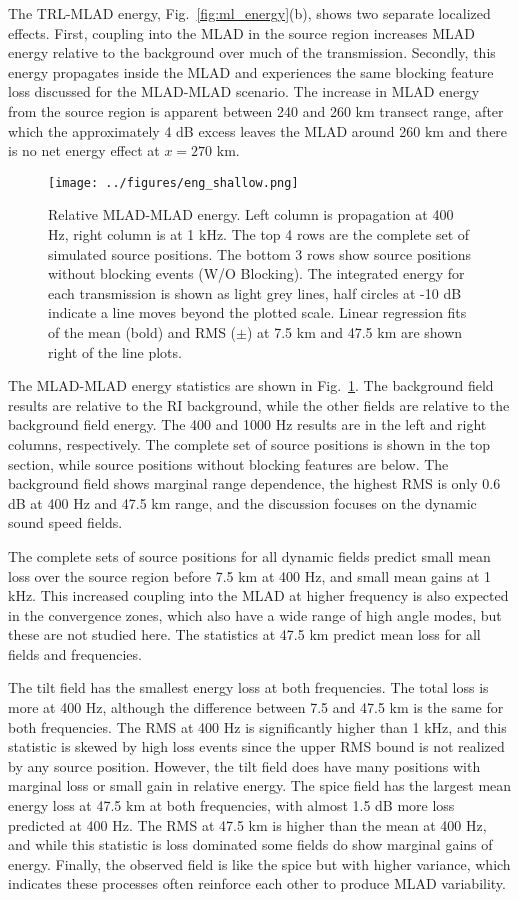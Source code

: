 \documentclass[preprint,NumberedRefs]{JASA}
\begin{document}
The TRL-MLAD energy, Fig.~\ref{fig:ml_energy}(b), shows two separate localized effects. First, coupling into the MLAD in the source region increases MLAD energy relative to the background over much of the transmission. Secondly, this energy propagates inside the MLAD and experiences the same blocking feature loss discussed for the MLAD-MLAD scenario. The increase in MLAD energy from the source region is apparent between 240 and 260 km transect range, after which the approximately 4 dB excess leaves the MLAD around 260 km and there is no net energy effect at $x=270$ km.

\begin{figure}
\texttt{[image: ../figures/eng\_shallow.png]}
    \caption{Relative MLAD-MLAD energy. Left column is propagation at 400 Hz, right column is at 1 kHz. The top 4 rows are the complete set of simulated source positions. The bottom 3 rows show source positions without blocking events (W/O Blocking). The integrated energy for each transmission is shown as light grey lines, half circles at -10 dB indicate a line moves beyond the plotted scale. Linear regression fits of the mean (bold) and RMS ($\pm$) at 7.5 km and 47.5 km are shown right of the line plots.}
    \label{fig:shal_eng}
\end{figure}
The MLAD-MLAD energy statistics are shown in Fig.~\ref{fig:shal_eng}. The background field results are relative to the RI background, while the other fields are relative to the background field energy. The 400 and 1000 Hz results are in the left and right columns, respectively. The complete set of source positions is shown in the top section, while source positions without blocking features are below. The background field shows marginal range dependence, the highest RMS is only 0.6 dB at 400 Hz and 47.5 km range, and the discussion focuses on the dynamic sound speed fields.

The complete sets of source positions for all dynamic fields predict small mean loss over the source region before 7.5 km at 400 Hz, and small mean gains at 1 kHz. This increased coupling into the MLAD at higher frequency is also expected in the convergence zones, which also have a wide range of high angle modes, but these are not studied here. The statistics at 47.5 km predict mean loss for all fields and frequencies.

The tilt field has the smallest energy loss at both frequencies. The total loss is more at 400 Hz, although the difference between 7.5 and 47.5 km is the same for both frequencies. The RMS at 400 Hz is significantly higher than 1 kHz, and this statistic is skewed by high loss events since the upper RMS bound is not realized by any source position. However, the tilt field does have many positions with marginal loss or small gain in relative energy. The spice field has the largest mean energy loss at 47.5 km at both frequencies, with almost 1.5 dB more loss predicted at 400 Hz. The RMS at 47.5 km is higher than the mean at 400 Hz, and while this statistic is loss dominated some fields do show marginal gains of energy. Finally, the observed field is like the spice but with higher variance, which indicates these processes often reinforce each other to produce MLAD variability.
\end{document}
